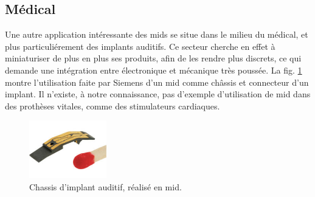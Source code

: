 \subsection{Médical}
Une autre application intéressante des \glspl{mid} se situe dans le milieu du médical, et plus particuliérement des implants auditifs.
Ce secteur cherche en effet à miniaturiser de plus en plus ses produits, afin de les rendre plus discrets, ce qui demande une intégration entre électronique et mécanique très poussée.
La fig. \ref{fig:mid-siemens-example} montre l'utilisation faite par Siemens d'un \gls{mid} comme châssis et connecteur d'un implant.
Il n'existe, à notre connaissance, pas d'exemple d'utilisation de \gls{mid} dans des prothèses vitales, comme des stimulateurs cardiaques.


\begin{figure}[h]
    \begin{center}
        \includegraphics[width=0.3\textwidth]{images/mid-hearing-aid_RED}
        \caption{Chassis d'implant auditif, réalisé en \gls{mid}.}
        \label{fig:mid-siemens-example}
    \end{center}
\end{figure}

